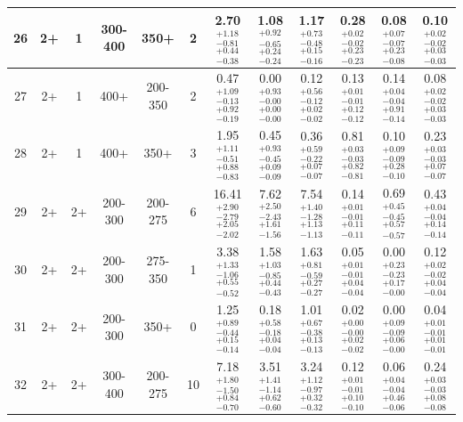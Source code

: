 \begin{landscape}
\begin{table}[hp]
\begin{lrbox}{\resBox}
\begin{tabular}{|c|c|c|c|c||c|c||c|c|c|c|c|}
 \hline
             26 &              2+ &               1 &         300-400 &            350+  &      2 &   2.70 $^{+1.18}_{-0.81}$ $^{+0.44}_{-0.38}$ &   1.08 $^{+0.92}_{-0.65}$ $^{+0.24}_{-0.24}$ &   1.17 $^{+0.73}_{-0.48}$ $^{+0.15}_{-0.16}$ &   0.28 $^{+0.02}_{-0.02}$ $^{+0.23}_{-0.23}$ &   0.08 $^{+0.07}_{-0.07}$ $^{+0.23}_{-0.08}$ &   0.10 $^{+0.02}_{-0.02}$ $^{+0.03}_{-0.03}$ \\
 \hline
             27 &              2+ &               1 &            400+ &         200-350  &      2 &   0.47 $^{+1.09}_{-0.13}$ $^{+0.92}_{-0.19}$ &   0.00 $^{+0.93}_{-0.00}$ $^{+0.00}_{-0.00}$ &   0.12 $^{+0.56}_{-0.12}$ $^{+0.02}_{-0.02}$ &   0.13 $^{+0.01}_{-0.01}$ $^{+0.12}_{-0.12}$ &   0.14 $^{+0.04}_{-0.04}$ $^{+0.91}_{-0.14}$ &   0.08 $^{+0.02}_{-0.02}$ $^{+0.03}_{-0.03}$ \\
 \hline
             28 &              2+ &               1 &            400+ &            350+  &      3 &   1.95 $^{+1.11}_{-0.51}$ $^{+0.88}_{-0.83}$ &   0.45 $^{+0.93}_{-0.45}$ $^{+0.09}_{-0.09}$ &   0.36 $^{+0.59}_{-0.22}$ $^{+0.07}_{-0.07}$ &   0.81 $^{+0.03}_{-0.03}$ $^{+0.82}_{-0.81}$ &   0.10 $^{+0.09}_{-0.09}$ $^{+0.28}_{-0.10}$ &   0.23 $^{+0.03}_{-0.03}$ $^{+0.07}_{-0.07}$ \\
 \hline
             29 &              2+ &              2+ &         200-300 &         200-275  &      6 &  16.41 $^{+2.90}_{-2.79}$ $^{+2.05}_{-2.02}$ &   7.62 $^{+2.50}_{-2.43}$ $^{+1.61}_{-1.56}$ &   7.54 $^{+1.40}_{-1.28}$ $^{+1.13}_{-1.13}$ &   0.14 $^{+0.01}_{-0.01}$ $^{+0.11}_{-0.11}$ &   0.69 $^{+0.45}_{-0.45}$ $^{+0.57}_{-0.57}$ &   0.43 $^{+0.04}_{-0.04}$ $^{+0.14}_{-0.14}$ \\
 \hline
             30 &              2+ &              2+ &         200-300 &         275-350  &      1 &   3.38 $^{+1.33}_{-1.06}$ $^{+0.55}_{-0.52}$ &   1.58 $^{+1.03}_{-0.85}$ $^{+0.44}_{-0.43}$ &   1.63 $^{+0.81}_{-0.59}$ $^{+0.27}_{-0.27}$ &   0.05 $^{+0.01}_{-0.01}$ $^{+0.04}_{-0.04}$ &   0.00 $^{+0.23}_{-0.23}$ $^{+0.17}_{-0.00}$ &   0.12 $^{+0.02}_{-0.02}$ $^{+0.04}_{-0.04}$ \\
 \hline
             31 &              2+ &              2+ &         200-300 &            350+  &      0 &   1.25 $^{+0.89}_{-0.44}$ $^{+0.15}_{-0.14}$ &   0.18 $^{+0.58}_{-0.18}$ $^{+0.04}_{-0.04}$ &   1.01 $^{+0.67}_{-0.38}$ $^{+0.13}_{-0.13}$ &   0.02 $^{+0.00}_{-0.00}$ $^{+0.02}_{-0.02}$ &   0.00 $^{+0.09}_{-0.09}$ $^{+0.06}_{-0.00}$ &   0.04 $^{+0.01}_{-0.01}$ $^{+0.01}_{-0.01}$ \\
 \hline
             32 &              2+ &              2+ &         300-400 &         200-275  &     10 &   7.18 $^{+1.80}_{-1.50}$ $^{+0.84}_{-0.70}$ &   3.51 $^{+1.41}_{-1.14}$ $^{+0.62}_{-0.60}$ &   3.24 $^{+1.12}_{-0.97}$ $^{+0.32}_{-0.32}$ &   0.12 $^{+0.01}_{-0.01}$ $^{+0.10}_{-0.10}$ &   0.06 $^{+0.04}_{-0.04}$ $^{+0.46}_{-0.06}$ &   0.24 $^{+0.03}_{-0.03}$ $^{+0.08}_{-0.08}$ \\

\end{tabular}
\end{lrbox}
\end{table}
\end{landscape}
